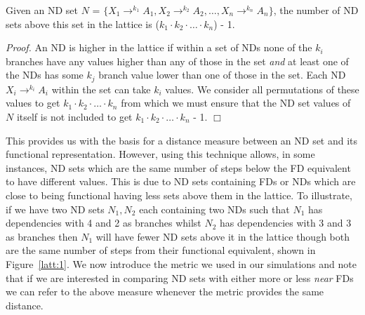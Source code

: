 \begin{proposition}
\begin{rm}
Given an ND set $N$ = \linebreak[4]   $\{ X_1 \to^{k_1} A_1, X_2 \to^{k_2} A_2,
 \ldots, X_n \to^{k_n} A_n \}$, the number of ND sets above this set in the
lattice is ($k_1 \cdot k_2 \cdot \ldots \cdot k_n$) - 1.
\end{rm}
\end{proposition}

{\em Proof.} An ND is higher in the lattice if within a 
set of NDs none of the $k_i$ branches have any values higher than
any of those in the set {\em and} at least one of the NDs has some 
$k_j$ branch value
lower than one of those in the set. Each ND $X_i \to^{k_i} A_i$ within
the set can take $k_i$ values. We consider all permutations of these
values to get $k_1 \cdot k_2 \cdot \ldots \cdot k_n$ from which we 
must ensure that the ND set values of $N$ itself is not included to get
$k_1 \cdot k_2 \cdot \ldots \cdot k_n$ - 1. $\Box$

\smallskip

This provides us with the basis for a distance measure between an ND set
and its functional representation. However,  using this technique allows,
in some instances, ND sets which are the same number of steps below the
FD equivalent to have different values. This is due to ND sets containing
FDs or NDs which are close to being functional having less sets above them
in the lattice. To illustrate, if we have two ND sets $N_1,N_2$ each containing two NDs such that $N_1$ has dependencies with 4 and 2 as branches whilst $N_2$ has dependencies with 3 and 3 as branches then $N_1$ will have fewer ND sets
above it in the lattice though both are the same number of steps from their
functional equivalent, shown in Figure~\ref{latt:1}. We now introduce the 
metric we used in our simulations
and note that if we are interested in comparing ND sets with either more 
or less {\em near} FDs we can refer to the above measure 
whenever the metric provides the same distance.
\smallskip

